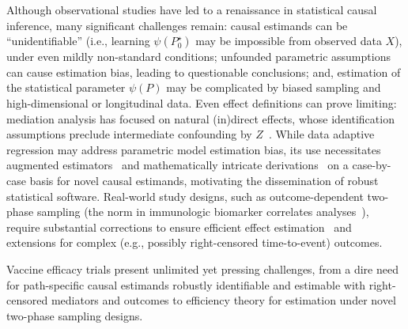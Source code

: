 Although observational studies have led to a renaissance in statistical causal
inference, many significant challenges remain: causal estimands can be
``unidentifiable'' (i.e., learning $\psi(P_0^{\star})$ may be impossible from
observed data $X$), under even mildly non-standard conditions; unfounded
parametric assumptions can cause estimation bias, leading to questionable
conclusions; and, estimation of the statistical parameter $\psi(P)$ may be
complicated by biased sampling and high-dimensional or longitudinal data. Even
effect definitions can prove limiting: mediation analysis has focused on natural
(in)direct effects, whose identification assumptions preclude intermediate
confounding by $Z$~\citep{petersen2006estimation, tchetgen2014identification,
miles2017partial, vanderweele2017mediation}. While data adaptive regression may
address parametric model estimation bias, its use necessitates augmented
estimators~\citep{pfanzagl1985contributions, vdl2011targeted, vdl2018targeted,
coyle2020targeted} and mathematically intricate
derivations~\citep{carone2018higher} on a case-by-case basis for novel causal
estimands, motivating the dissemination of robust statistical software.
Real-world study designs, such as outcome-dependent two-phase sampling (the norm
in immunologic biomarker correlates analyses~\citep{haynes2012immune}), require
substantial corrections to ensure efficient effect
estimation~\citep{hejazi2020efficient} and extensions for complex (e.g.,
possibly right-censored time-to-event) outcomes.

Vaccine efficacy trials present unlimited yet pressing challenges, from a dire
need for path-specific causal estimands robustly identifiable and estimable with
right-censored mediators and outcomes to efficiency theory for estimation under
novel two-phase sampling designs.


